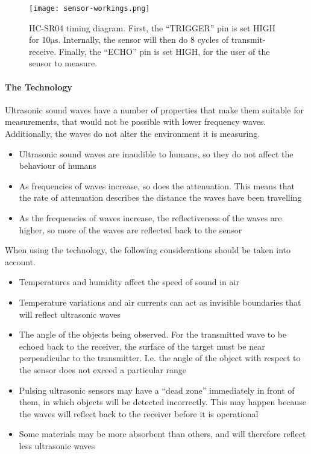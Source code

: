 \begin{figure}[htbp]
  \centering
  \texttt{[image: sensor-workings.png]}
  \caption[HC-SR04 timing diagram]{HC-SR04 timing diagram. First, the \enquote{TRIGGER} pin is set HIGH for 10$\si{\micro\second}$. Internally, the sensor will then do 8 cycles of transmit-receive. Finally, the \enquote{ECHO} pin is set HIGH, for the user of the sensor to measure.}
  \label{fig:sensor-workings}
\end{figure}

\paragraph{The Technology}
Ultrasonic sound waves have a number of properties that make them suitable for measurements, that would not be possible with lower frequency waves. Additionally, the waves do not alter the environment it is measuring.

\begin{itemize}
\item Ultrasonic sound waves are inaudible to humans, so they do not affect the behaviour of humans
\item As frequencies of waves increase, so does the attenuation. This means that the rate of attenuation describes the distance the waves have been travelling
\item As the frequencies of waves increase, the reflectiveness of the waves are higher, so more of the waves are reflected back to the sensor 
\end{itemize}

When using the technology, the following considerations should be taken into account.

\begin{itemize}
  \item Temperatures and humidity affect the speed of sound in air
  \item Temperature variations and air currents can act as invisible boundaries that will reflect ultrasonic waves
  \item The angle of the objects being observed. For the transmitted wave to be echoed back to the receiver, the surface of the target must be near perpendicular to the transmitter. I.e. the angle of the object with respect to the sensor does not exceed a particular range
  \item Pulsing ultrasonic sensors may have a \enquote{dead zone} immediately in front of them, in which objects will be detected incorrectly. This may happen because the waves will reflect back to the receiver before it is operational
  \item Some materials may be more absorbent than others, and will therefore reflect less ultrasonic waves
\end{itemize}


